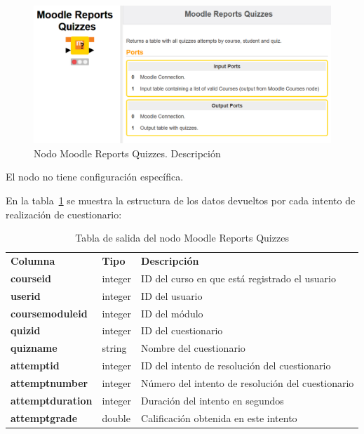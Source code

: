 \begin{figure}[!h]
	\centering
	\includegraphics[width=1\textwidth]{img/nodes_moodle_reports_quizzes.png}
	\caption{Nodo Moodle Reports Quizzes. Descripción}
	\label{fig:moodlereportsquizzes}
\end{figure}
\FloatBarrier


El nodo no tiene configuración específica. 
\

En la tabla~\ref{tab:moodle_reports_quizzes_desc} se muestra la estructura de los datos devueltos por cada intento de realización de cuestionario: 

\begin{table}[!h]
	\begin{center}
		\begin{tabular}{p{}p{}p{}}
			\toprule
			\textbf{Columna} & \textbf{Tipo} & \textbf{Descripción}\\
			\otoprule
			\textbf{courseid} & integer & ID del curso en que está registrado el usuario \\
         \hline
			\textbf{userid} & integer & ID del usuario \\
         \hline
         \textbf{coursemoduleid} & integer & ID del módulo \\
         \hline
		 \textbf{quizid} & integer & ID del cuestionario \\
         \hline
         \textbf{quizname} & string & Nombre del cuestionario \\
         \hline
		 \textbf{attemptid} & integer & ID del intento de resolución del cuestionario \\
         \hline
		 \textbf{attemptnumber} & integer & Número del intento de resolución del cuestionario \\
         \hline
		 \textbf{attemptduration} & integer & Duración del intento en segundos \\
         \hline
         \textbf{attemptgrade} & double & Calificación obtenida en este intento \\
         \bottomrule
		\end{tabular}
	\end{center}
	\caption{Tabla de salida del nodo Moodle Reports Quizzes}
	\label{tab:moodle_reports_quizzes_desc}
\end{table}
\FloatBarrier


